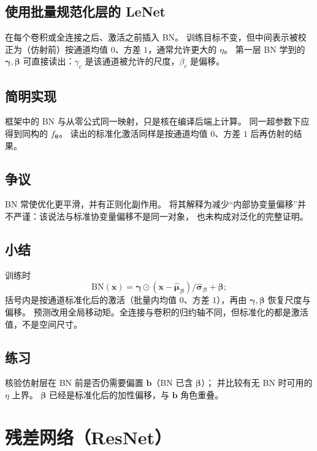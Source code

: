 \subsection{使用批量规范化层的 LeNet}

在每个卷积或全连接之后、激活之前插入 BN。
训练目标不变，但中间表示被校正为（仿射前）按通道均值 $0$、方差 $1$，通常允许更大的 $\eta$。
第一层 BN 学到的 $\bm{\gamma},\bm{\beta}$ 可直接读出：$\gamma_c$ 是该通道被允许的尺度，$\beta_c$ 是偏移。

\subsection{简明实现}

框架中的 BN 与从零公式同一映射，只是核在编译后端上计算。
同一超参数下应得到同构的 $f_{\bm{\theta}}$。
读出的标准化激活同样是按通道均值 $0$、方差 $1$ 后再仿射的结果。

\subsection{争议}

BN 常使优化更平滑，并有正则化副作用。
将其解释为减少“内部协变量偏移”并不严谨：该说法与标准协变量偏移不是同一对象，
也未构成对泛化的完整证明。

\subsection{小结}

训练时
\[
\mathrm{BN}(\bm{x})
=
\bm{\gamma}\odot(\bm{x}-\hat{\bm{\mu}}_{\mathcal{B}})/\hat{\bm{\sigma}}_{\mathcal{B}}+\bm{\beta};
\]
括号内是按通道标准化后的激活（批量内均值 $0$、方差 $1$），再由 $\bm{\gamma},\bm{\beta}$ 恢复尺度与偏移。
预测改用全局移动矩。全连接与卷积的归约轴不同，但标准化的都是激活值，不是空间尺寸。

\subsection{练习}

核验仿射层在 BN 前是否仍需要偏置 $\bm{b}$（BN 已含 $\bm{\beta}$）；
并比较有无 BN 时可用的 $\eta$ 上界。
$\bm{\beta}$ 已经是标准化后的加性偏移，与 $\bm{b}$ 角色重叠。

\section{残差网络（ResNet）}


